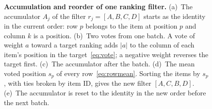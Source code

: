 \begin{figure}[!htbp]
{%
}
\caption{\textbf{Accumulation and reorder of one ranking filter.} (a)~The accumulator $A_j$ of the filter $r_j = [A,B,C,D]$ starts as the identity in the current order: row $p$ belongs to the item at position $p$ and column $k$ is a position. (b)~Two votes from one batch. A vote of weight $a$ toward a target ranking adds $|a|$ to the column of each item's position in the target~\eqref{eq:vote}; a negative weight reverses the target first. (c)~The accumulator after the batch. (d)~The mean voted position $s_p$ of every row~\eqref{eq:rowmean}. Sorting the items by $s_p$, with ties broken by item ID, gives the new filter $[A,C,B,D]$. (e)~The accumulator is reset to the identity in the new order before the next batch.}
\label{fig:accumulation}
\end{figure}
